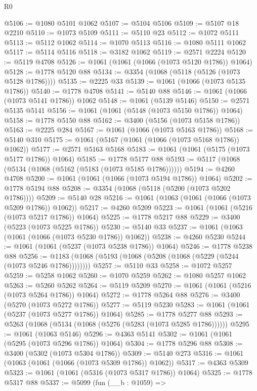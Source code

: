 \begin{lexlean}{R0}
\begin{coremodule}
@5106 := @1080 @5101 @1062
@5107 := @5104 @5106
@5109 := @5107 @18 @2210
@5110 := @1073 @5109
@5111 := @5110 @23
@5112 := @1072 @5111
@5113 := @5112 @1062
@5114 := @1070 @5113
@5116 := @1080 @5111 @1062
@5117 := @5114 @5116
@5118 := @3182 @1062
@5119 := @2571 @2224
@5120 := @5119 @4708
@5126 := @1061 (@1061 (@1066 (@1073 @5120 @1786)) @1064)
@5128 := @1778 @5120 @88
@5134 := @3354 (@1068 (@5118 (@5126 (@1073 @5128 @1786))))
@5135 := @2225 @33
@5139 := @1061 (@1066 (@1073 @5135 @1786))
@5140 := @1778 @4708
@5141 := @5140 @88
@5146 := @1061 (@1066 (@1073 @5141 @1786)) @1062
@5148 := @1061 (@5139 @5146)
@5150 := @2571 @5135 @5141
@5156 := @1061 (@1061 (@5148 (@1073 @5150 @1786)) @1064)
@5158 := @1778 @5150 @88
@5162 := @3400 (@5156 (@1073 @5158 @1786))
@5163 := @2225 @284
@5167 := @1061 (@1066 (@1073 @5163 @1786))
@5168 := @5140 @310
@5175 := @1061 (@5167 (@1061 (@1066 (@1073 @5168 @1786)) @1062))
@5177 := @2571 @5163 @5168
@5183 := @1061 (@1061 (@5175 (@1073 @5177 @1786)) @1064)
@5185 := @1778 @5177 @88
@5193 := @5117 (@1068 (@5134 (@1068 (@5162 (@5183 (@1073 @5185 @1786))))))
@5194 := @4260 @4708
@5200 := @1061 (@1061 (@1066 (@1073 @5194 @1786)) @1064)
@5202 := @1778 @5194 @88
@5208 := @3354 (@1068 (@5118 (@5200 (@1073 @5202 @1786))))
@5209 := @5140 @28
@5216 := @1061 (@1063 (@1061 (@1066 (@1073 @5209 @1786)) @1062))
@5217 := @4260 @5209
@5223 := @1061 (@1061 (@5216 (@1073 @5217 @1786)) @1064)
@5225 := @1778 @5217 @88
@5229 := @3400 (@5223 (@1073 @5225 @1786))
@5230 := @5140 @33
@5237 := @1061 (@1063 (@1061 (@1066 (@1073 @5230 @1786)) @1062))
@5238 := @4260 @5230
@5244 := @1061 (@1061 (@5237 (@1073 @5238 @1786)) @1064)
@5246 := @1778 @5238 @88
@5256 := @1183 (@1068 (@5193 (@1068 (@5208 (@1068 (@5229 (@5244 (@1073 @5246 @1786))))))))
@5257 := @5110 @33
@5258 := @1072 @5257
@5259 := @5258 @1062
@5260 := @1070 @5259
@5262 := @1080 @5257 @1062
@5263 := @5260 @5262
@5264 := @5119 @5209
@5270 := @1061 (@1061 (@5216 (@1073 @5264 @1786)) @1064)
@5272 := @1778 @5264 @88
@5276 := @3400 (@5270 (@1073 @5272 @1786))
@5277 := @5119 @5230
@5283 := @1061 (@1061 (@5237 (@1073 @5277 @1786)) @1064)
@5285 := @1778 @5277 @88
@5293 := @5263 (@1068 (@5134 (@1068 (@5276 (@5283 (@1073 @5285 @1786))))))
@5295 := @1061 (@1063 @5146)
@5296 := @4363 @5141
@5302 := @1061 (@1061 (@5295 (@1073 @5296 @1786)) @1064)
@5304 := @1778 @5296 @88
@5308 := @3400 (@5302 (@1073 @5304 @1786))
@5309 := @5140 @273
@5316 := @1061 (@1063 (@1061 (@1066 (@1073 @5309 @1786)) @1062))
@5317 := @4363 @5309
@5323 := @1061 (@1061 (@5316 (@1073 @5317 @1786)) @1064)
@5325 := @1778 @5317 @88
@5337 := @5099
    (fun (__b : @1059) =>

\end{coremodule}
\end{lexlean}
